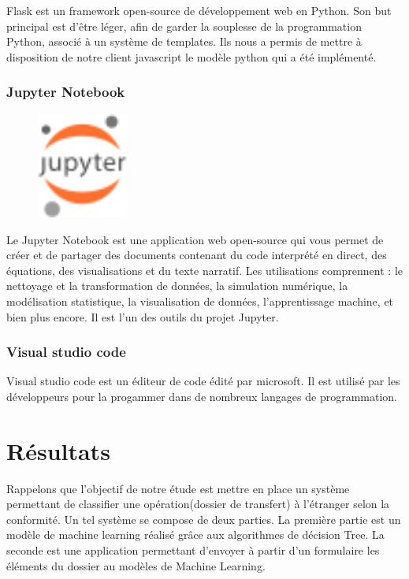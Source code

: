 Flask est un framework open-source de développement web en Python. Son but 
principal est d'être léger, afin de garder la souplesse de la programmation
Python, associé à un système de templates. Ils nous a permis de mettre à 
disposition de notre client javascript le modèle python qui a été implémenté.

\subsubsection{Jupyter Notebook}
\begin{figure}
  \vspace{-7mm}
  \includegraphics[width=3cm]{images/jupyter.png}
\end{figure}

Le Jupyter Notebook est une application web open-source qui vous permet de 
créer et de partager des documents contenant du code interprété en direct, 
des équations, des visualisations et du texte narratif. Les utilisations 
comprennent : le nettoyage et la transformation de données, la simulation 
numérique, la modélisation statistique, la visualisation de données, 
l'apprentissage machine, et bien plus encore. Il est l'un des outils  
du projet Jupyter.

\subsubsection{Visual studio code}

Visual studio code est un éditeur de code édité par microsoft. Il est utilisé
par les développeurs pour la progammer dans de nombreux langages de
programmation. 


 \section{Résultats}
Rappelons que l'objectif de notre étude est mettre en place un système
permettant de classifier une opération(dossier de transfert) à l'étranger selon
la conformité. Un tel système se compose de deux parties. La première partie est
un modèle de machine learning réalisé grâce aux algorithmes de décision Tree. La
seconde est une application permettant d'envoyer à partir d'un formulaire les
éléments du dossier au modèles de Machine Learning.

